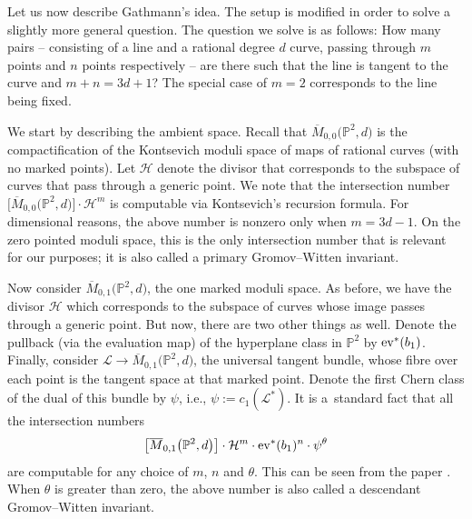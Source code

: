 \documentclass[pdftex]{sigma}
\numberwithin{equation}{section}
\begin{document}
Let us now describe Gathmann's idea. The setup is modified in order to solve a slightly
more general question. The question we solve is as follows:
How many pairs -- consisting of a line and a rational degree $d$ curve, passing through $m$ points and $n$
points respectively -- are there such that the line is tangent to the curve and $m+n = 3d+1$?
The special case of $m = 2$ corresponds to the line being fixed.

We start by describing the ambient space.
Recall that $\overline{M}_{0,0}\bigl(\mathbb{P}^2, d\bigr)$ is the compactification of the
Kontsevich moduli space of maps of rational curves (with no marked points). Let $\mathcal{H}$ denote the
divisor that corresponds to the subspace of curves that pass through a generic point. We note that the intersection number
$
\bigl[\overline{M}_{0,0}\bigl(\mathbb{P}^2, d\bigr)\bigr]\cdot \mathcal{H}^m
$
is computable via Kontsevich's recursion formula. For dimensional reasons,
the above number is nonzero only when $m = 3d-1$. On the zero pointed moduli space, this is the only intersection number
that is relevant for our purposes; it is also called a primary Gromov--Witten invariant.

Now consider $\overline{M}_{0,1}\bigl(\mathbb{P}^2, d\bigr)$, the one marked moduli space. As before, we have the
divisor $\mathcal{H}$ which corresponds to the subspace of curves whose image passes through a generic point.
But now, there are two other things as well.
Denote the pullback (via the evaluation map) of the hyperplane class in $\mathbb{P}^2$ by
${\rm ev}^*(b_1)$. Finally, consider
$\mathcal{L}\longrightarrow \overline{M}_{0,1}\bigl(\mathbb{P}^2, d\bigr)$,
the universal tangent bundle, whose fibre
over each point is the tangent space at that marked point. Denote the first Chern class of the dual of this bundle
by $\psi$, i.e.,
$
\psi :=  c_1(\mathcal{L}^*)$.
It is a~standard fact that all the intersection numbers
\begin{align}
\bigl[\overline{M}_{0,1}\bigl(\mathbb{P}^2, d\bigr)\bigr]\cdot \mathcal{H}^m \cdot {\rm ev}^*(b_1)^n \cdot \psi^{\theta} \label{primary_sec_GW}
\end{align}
are computable for any choice of $m$, $n$ and $\theta$.
This can be seen from the paper \cite[p.~311, Proposition 2.2]{Ionel_genus_one}.
When $\theta$ is greater than zero, the above number is also called a descendant Gromov--Witten invariant.
\end{document}
